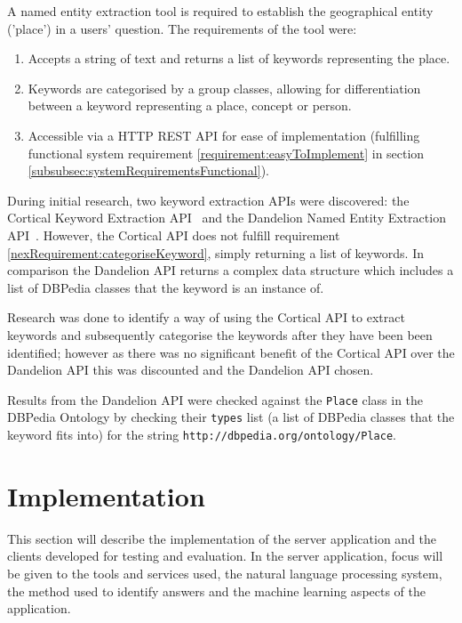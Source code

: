 \documentclass[authoryearcitations]{UoYCSproject}
\begin{document}
A named entity extraction tool is required to establish the geographical entity ('place') in a users' question. The requirements of the tool were:
\begin{enumerate}
  \item Accepts a string of text and returns a list of keywords representing the place.
  \item \label{nexRequirement:categoriseKeyword} Keywords are categorised by a group classes, allowing for differentiation between a keyword representing a place, concept or person.
  \item Accessible via a HTTP REST API for ease of implementation (fulfilling functional system requirement \ref{requirement:easyToImplement} in section \ref{subsubsec:systemRequirementsFunctional}).
\end{enumerate}

During initial research, two keyword extraction APIs were discovered: the Cortical Keyword Extraction API~\cite{serviceCorticalNex} and the Dandelion Named Entity Extraction API~\cite{serviceDandelionNex}. However, the Cortical API does not fulfill requirement \ref{nexRequirement:categoriseKeyword}, simply returning a list of keywords. In comparison the Dandelion API returns a complex data structure which includes a list of DBPedia classes that the keyword is an instance of.

Research was done to identify a way of using the Cortical API to extract keywords and subsequently categorise the keywords after they have been been identified; however as there was no significant benefit of the Cortical API over the Dandelion API this was discounted and the Dandelion API chosen.

Results from the Dandelion API were checked against the \texttt{Place} class in the DBPedia Ontology by checking their \texttt{types} list (a list of DBPedia classes that the keyword fits into) for the string \texttt{http://dbpedia.org/ontology/Place}.

\newpage
\chapter{Implementation}
\label{sec:implementation}
This section will describe the implementation of the server application and the clients developed for testing and evaluation. In the server application, focus will be given to the tools and services used, the natural language processing system, the method used to identify answers and the machine learning aspects of the application.
\end{document}
